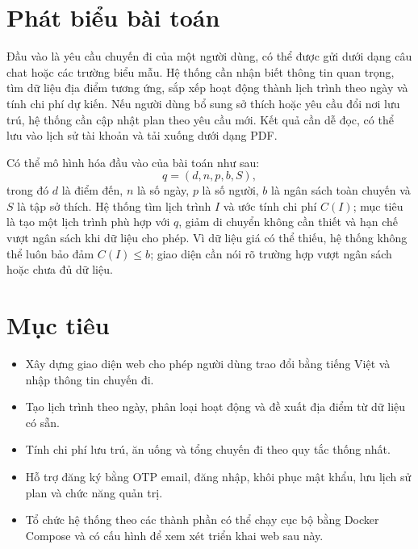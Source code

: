\documentclass[12pt,a4paper,oneside]{report}
\begin{document}
\section{Phát biểu bài toán}
Đầu vào là yêu cầu chuyến đi của một người dùng, có thể được gửi dưới dạng câu chat hoặc các trường biểu mẫu. Hệ thống cần nhận biết thông tin quan trọng, tìm dữ liệu địa điểm tương ứng, sắp xếp hoạt động thành lịch trình theo ngày và tính chi phí dự kiến. Nếu người dùng bổ sung sở thích hoặc yêu cầu đổi nơi lưu trú, hệ thống cần cập nhật plan theo yêu cầu mới. Kết quả cần dễ đọc, có thể lưu vào lịch sử tài khoản và tải xuống dưới dạng PDF.

Có thể mô hình hóa đầu vào của bài toán như sau:
\[
  q=(d,n,p,b,S),
\]
trong đó $d$ là điểm đến, $n$ là số ngày, $p$ là số người, $b$ là ngân sách toàn chuyến và $S$ là tập sở thích. Hệ thống tìm lịch trình $I$ và ước tính chi phí $C(I)$; mục tiêu là tạo một lịch trình phù hợp với $q$, giảm di chuyển không cần thiết và hạn chế vượt ngân sách khi dữ liệu cho phép. Vì dữ liệu giá có thể thiếu, hệ thống không thể luôn bảo đảm $C(I)\leq b$; giao diện cần nói rõ trường hợp vượt ngân sách hoặc chưa đủ dữ liệu.

\section{Mục tiêu}
\begin{itemize}
  \item Xây dựng giao diện web cho phép người dùng trao đổi bằng tiếng Việt và nhập thông tin chuyến đi.
  \item Tạo lịch trình theo ngày, phân loại hoạt động và đề xuất địa điểm từ dữ liệu có sẵn.
  \item Tính chi phí lưu trú, ăn uống và tổng chuyến đi theo quy tắc thống nhất.
  \item Hỗ trợ đăng ký bằng OTP email, đăng nhập, khôi phục mật khẩu, lưu lịch sử plan và chức năng quản trị.
  \item Tổ chức hệ thống theo các thành phần có thể chạy cục bộ bằng Docker Compose và có cấu hình để xem xét triển khai web sau này.
\end{itemize}
\end{document}
